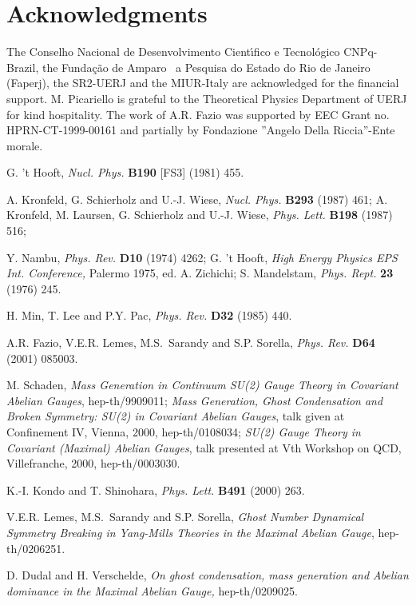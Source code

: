 \documentclass[a4paper,12pt]{article}
\begin{document}
\section*{Acknowledgments}

The Conselho Nacional de Desenvolvimento Cient\'{\i }fico e Tecnol\'{o}gico
CNPq-Brazil, the Funda{\c{c}}{\~{a}}o de Amparo {\ a Pesquisa do Estado do
Rio de Janeiro (Faperj), the SR2-UERJ and the MIUR-Italy are acknowledged
for the financial support. M. Picariello is grateful to the Theoretical
Physics Department of UERJ for kind hospitality. }The work of A.R. Fazio was
supported by EEC Grant no. HPRN-CT-1999-00161 and partially by Fondazione
''Angelo Della Riccia''-Ente morale.

\begin{thebibliography}{99}
  G. 't Hooft, \emph{Nucl. Phys. }\textbf{B190} [FS3] (1981) 455.

  A. Kronfeld, G. Schierholz and U.-J. Wiese, \emph{Nucl. Phys. }%
\textbf{B293} (1987) 461; A. Kronfeld, M. Laursen, G. Schierholz and U.-J.
Wiese, \emph{Phys. Lett. }\textbf{B198} (1987) 516;

  Y. Nambu, \emph{Phys. Rev. }\textbf{D10} (1974) 4262; G. 't
Hooft, \emph{High Energy Physics EPS Int. Conference, }Palermo 1975, ed. A.
Zichichi; S. Mandelstam, \emph{Phys. Rept. }\textbf{23} (1976) 245.

  H. Min, T. Lee and P.Y. Pac, \emph{Phys. Rev. }\textbf{D32}
(1985) 440.

  A.R. Fazio, V.E.R. Lemes, M.S.\ Sarandy and S.P. Sorella, \emph{%
Phys. Rev. }\textbf{D64} (2001) 085003.

  M. Schaden, \emph{Mass Generation in Continuum SU(2) Gauge
Theory in Covariant Abelian Gauges}, hep-th/9909011; \emph{Mass Generation,
Ghost Condensation and Broken Symmetry: SU(2) in Covariant Abelian Gauges},
talk given at Confinement IV, Vienna, 2000, hep-th/0108034; \emph{SU(2)
Gauge Theory in Covariant (Maximal) Abelian Gauges}, talk presented at Vth
Workshop on QCD, Villefranche, 2000, hep-th/0003030.

  K.-I. Kondo and T. Shinohara, \emph{Phys. Lett. }\textbf{B491}
(2000) 263.

  V.E.R. Lemes, M.S.\ Sarandy and S.P. Sorella, \emph{Ghost
Number Dynamical Symmetry Breaking in Yang-Mills Theories in the Maximal
Abelian Gauge}, hep-th/0206251.

  D. Dudal and H. Verschelde, \emph{On ghost condensation, mass
generation and Abelian dominance in the Maximal Abelian Gauge, }%
hep-th/0209025.


\end{thebibliography}
\end{document}
